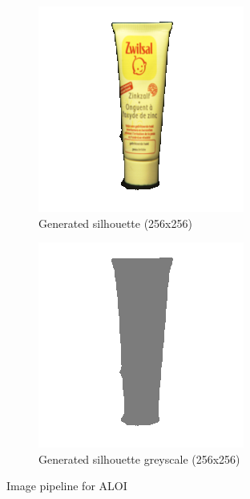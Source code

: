 \documentclass{article}
\begin{document}
\begin{figure}[h!]
\begin{subfigure}{0.23\textwidth}
    \includegraphics[width=\textwidth]{images/moisturisersil.png}
    \caption{Generated silhouette (256x256)}
    \label{moistsil}
  \end{subfigure}
  \hfill
  \begin{subfigure}{0.23\textwidth}
    \centering
    \includegraphics[width=\textwidth]{images/moisturisersilgrey.png}
    \caption{Generated silhouette greyscale (256x256)}
    \label{moistsilgrey}
  \end{subfigure}
  \caption{Image pipeline for ALOI}
  \label{datapipeline}
\end{figure}
\end{document}
